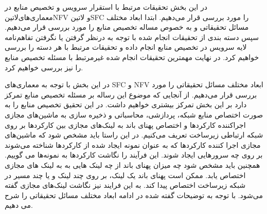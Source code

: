 

در این بخش تحقیقات مرتبط با استقرار سرویس و تخصیص منابع در معماری‌های‌لاتین{NFV} و ‌لاتین{SFC} را مورد بررسی قرار می‌دهیم.
ابتدا ابعاد مختلف مسائل تحقیقاتی و به خصوص مساله تخصیص منابع را مورد بررسی قرار می‌دهیم.
سپس دسته بندی از تحقیقات انجام شده با توجه به درنظر گرفتن یا نگرفتن تفاهم‌نامه لایه سرویس در تخصیص منابع انجام داده و تحقیقات مرتبط با هر دسته را بررسی خواهیم کرد. در نهایت مهمترین تحقیقات انجام شده غیرمرتبط با مسئله تخصیص منابع را نیز بررسی خواهیم کرد.


در این بخش با توجه به معماری‌های SFC و NFV ابعاد مختلف مسائل تحقیقاتی را مورد بررسی قرار می‌دهیم.
از آنجایی که موضوع این رساله بر مسئله تخصیص منابع تمرکز دارد بر این بخش تمرکز بیشتری خواهیم داشت. در این تحقیق تخصیص منابع را به صورت اختصاص منابع شبکه، پردازشی، محاسباتی و ذخیره سازی به ماشین‌های
مجازی اجراکننده کارکردها و اختصاص پهنای باند به لینک‌های مجازی بین کارکردها بر روی شبکه ارتباطی زیرساخت تعریف می‌کنیم.
در این راستا باید مشخص شود که ماشین‌های مجازی اجرا کننده کارکردها که به عنوان نمونه ایجاد شده از کارکردها شناخته می‌شوند بر روی چه سرورهایی ایجاد شوند.
این فرآیند را نگاشت کارکردها به نمونه‌ها می گوییم. همچنین باید مشخص شود چه میزان پهنای باند از چه لینک هایی به به لینک های مجازی اختصاص یابد.
ممکن است پهنای باند یک لینک، بر روی چند لینک و یا چند مسیر در شبکه زیرساخت اختصاص پیدا کند. به این فرایند نیز نگاشت لینک‌های مجازی گفته می‌شود.
با توجه به توضیحات گفته شده در ادامه ابعاد مختلف مسائل تحقیقاتی را شرح می دهیم.


